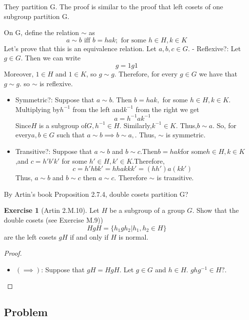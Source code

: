 \documentclass[
]{book}
\providecommand{\tightlist}{%
  \setlength{\itemsep}{0pt}\setlength{\parskip}{0pt}}
\theoremstyle{definition}
\theoremstyle{definition}
\theoremstyle{definition}
\newtheorem{exercise}{Exercise}[chapter]
\theoremstyle{definition}
\theoremstyle{remark}
\begin{document}
They partition G. The proof is similar to the proof that left cosets of one subgroup partition G.

On G, define the relation \(\sim\) as
\[ a \sim b \text{ iff } b = hak; \text{ for some } h \in H, k \in K\]
Let's prove that this is an equivalence relation.
Let \(a,b,c\in G\).
- Reflexive?:
Let \(g \in G\). Then we can write
\[ g = 1g1\]
Moreover, \(1 \in H\) and \(1 \in K\), so \(g \sim g\).
Therefore, for every \(g \in G\) we have that \(g \sim g\). so \(\sim\) is reflexive.

\begin{itemize}
\item
  Symmetric?:
  Suppose that \(a \sim b.\) Then \(b = hak,\) for some \(h \in H, k \in K.\) Multiplying by\(h^{-1}\) from the left and\(k^{-1}\) from the right we get
  \[ a = h^{-1}ak^{-1}\]
  Since\(H\) is a subgroup of\(G,h^{-1} \in H.\) Similarly,\(k^{-1} \in K.\) Thus,\(b \sim a.\)
  So, for every\(a,b \in G\) such that \(a \sim b\implies b \sim a,\). Thus, \(\sim\) is symmetric.
\item
  Transitive?:
  Suppose that \(a \sim b\) and \(b \sim c\).Then\(b = hak\)for some\(h \in H,k \in K\),and \(c=h'b'k'\) for some \(h' \in H,k' \in K\).Therefore,
  \[c=h'hbk'=hhakkk'= (hh')a(kk')\]
  Thus, \(a\sim b\) and \(b\sim c\) then \(a\sim c\). Therefore \(\sim\) is transitive.
\end{itemize}

By Artin's book Proposition 2.7.4, double cosets partition G?

\begin{exercise}[Artin 2.M.10]
\protect\hypertarget{exr:unnamed-chunk-240}{}\label{exr:unnamed-chunk-240}Let \(H\) be a subgroup of a group \(G\). Show that the double cosets (see Exercise M.9))
\[HgH = \{h_1gh_2 | h_1, h_2 \in H\}\]
are the left cosets \(gH\) if and only if \(H\) is normal.
\end{exercise}

\begin{proof}
\leavevmode

\begin{itemize}
\tightlist
\item
  \((\implies)\): Suppose that \(gH=HgH\). Let \(g\in G\) and \(h\in H\).
  \(ghg^{-1}\in H?\).
\end{itemize}

\end{proof}

\hypertarget{problem-3}{%
\subsection{Problem}\label{problem-3}}
\end{document}
